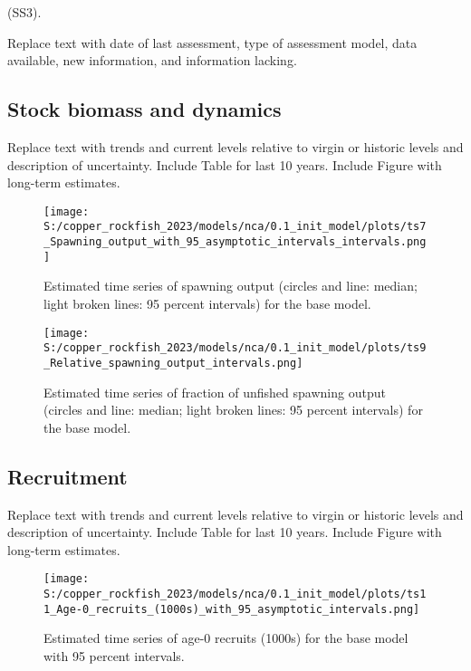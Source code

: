 \documentclass[11pt,
  english,
  letterpaper,
]{article}
\begin{document}
(SS3).

Replace text with date of last assessment, type of assessment model, data available, new information, and information lacking.

\hypertarget{stock-biomass-and-dynamics}{%
\subsection*{Stock biomass and dynamics}\label{stock-biomass-and-dynamics}}

Replace text with trends and current levels relative to virgin or historic levels and description of uncertainty. Include Table for last 10 years. Include Figure with long-term estimates.



\begin{figure}
\centering
\texttt{[image: S:/copper\_rockfish\_2023/models/nca/0.1\_init\_model/plots/ts7\_Spawning\_output\_with\_95\_asymptotic\_intervals\_intervals.png]}
\caption{Estimated time series of spawning output (circles and line: median; light broken lines: 95 percent intervals) for the base model.\label{fig:es-sb}}
\end{figure}

\begin{figure}
\centering
\texttt{[image: S:/copper\_rockfish\_2023/models/nca/0.1\_init\_model/plots/ts9\_Relative\_spawning\_output\_intervals.png]}
\caption{Estimated time series of fraction of unfished spawning output (circles and line: median; light broken lines: 95 percent intervals) for the base model.\label{fig:es-depl}}
\end{figure}

\clearpage

\hypertarget{recruitment}{%
\subsection*{Recruitment}\label{recruitment}}

Replace text with trends and current levels relative to virgin or historic levels and description of uncertainty. Include Table for last 10 years. Include Figure with long-term estimates.



\begin{figure}
\centering
\texttt{[image: S:/copper\_rockfish\_2023/models/nca/0.1\_init\_model/plots/ts11\_Age-0\_recruits\_(1000s)\_with\_95\_asymptotic\_intervals.png]}
\caption{Estimated time series of age-0 recruits (1000s) for the base model with 95 percent intervals.\label{fig:es-recruits}}
\end{figure}
\end{document}
